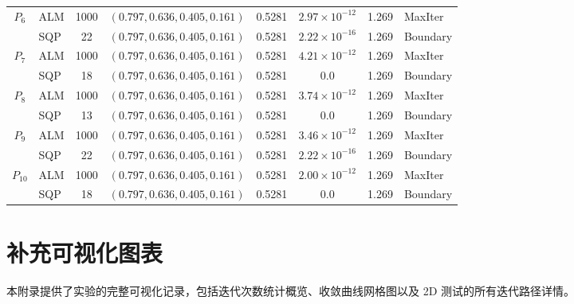 \documentclass[a4paper,12pt]{article}
\begin{document}
\begin{table}[H]
\begin{tabular}{clc c ccc l}
        \multirow{2}{*}{$P_6$} 
        & ALM & 1000 & $(0.797, 0.636, 0.405, 0.161)$ & 0.5281 & $2.97 \times 10^{-12}$ & 1.269 & MaxIter \\
        & SQP & 22   & $(0.797, 0.636, 0.405, 0.161)$ & 0.5281 & $2.22 \times 10^{-16}$ & 1.269 & Boundary \\ \cmidrule{1-8}

        \multirow{2}{*}{$P_7$} 
        & ALM & 1000 & $(0.797, 0.636, 0.405, 0.161)$ & 0.5281 & $4.21 \times 10^{-12}$ & 1.269 & MaxIter \\
        & SQP & 18   & $(0.797, 0.636, 0.405, 0.161)$ & 0.5281 & 0.0 & 1.269 & Boundary \\ \cmidrule{1-8}

        \multirow{2}{*}{$P_8$} 
        & ALM & 1000 & $(0.797, 0.636, 0.405, 0.161)$ & 0.5281 & $3.74 \times 10^{-12}$ & 1.269 & MaxIter \\
        & SQP & 13   & $(0.797, 0.636, 0.405, 0.161)$ & 0.5281 & 0.0 & 1.269 & Boundary \\ \cmidrule{1-8}

        \multirow{2}{*}{$P_9$} 
        & ALM & 1000 & $(0.797, 0.636, 0.405, 0.161)$ & 0.5281 & $3.46 \times 10^{-12}$ & 1.269 & MaxIter \\
        & SQP & 22   & $(0.797, 0.636, 0.405, 0.161)$ & 0.5281 & $2.22 \times 10^{-16}$ & 1.269 & Boundary \\ \cmidrule{1-8}

        \multirow{2}{*}{$P_{10}$} 
        & ALM & 1000 & $(0.797, 0.636, 0.405, 0.161)$ & 0.5281 & $2.00 \times 10^{-12}$ & 1.269 & MaxIter \\
        & SQP & 18   & $(0.797, 0.636, 0.405, 0.161)$ & 0.5281 & 0.0 & 1.269 & Boundary \\
        \bottomrule
    \end{tabular}
\end{table}



\clearpage
\section{补充可视化图表} \label{app:plots}
\setcounter{figure}{0} %
\renewcommand{\thefigure}{\thesection.\arabic{figure}}

本附录提供了实验的完整可视化记录，包括迭代次数统计概览、收敛曲线网格图以及 2D 测试的所有迭代路径详情。
\end{document}
